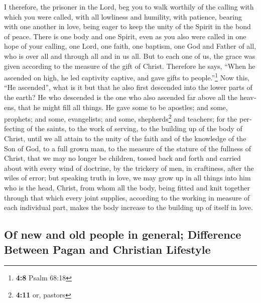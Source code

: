 \begin{paracol}{2}
\begin{otherlanguage}{english}
 I therefore, the prisoner in the Lord, beg you to walk
worthily of the calling with which you were called,  with
all lowliness and humility, with patience, bearing with one another in
love,  being eager to keep the unity of the Spirit in the
bond of peace.  There is one body and one Spirit, even as
you also were called in one hope of your calling,  one
Lord, one faith, one baptism,  one God and Father of all,
who is over all and through all and in us all.  But to
each one of us, the grace was given according to the measure of the gift
of Christ.  Therefore he says, ``When he ascended on high,
he led captivity captive, and gave gifts to people.''\footnote{\textbf{4:8}
  Psalm 68:18}  Now this, ``He ascended'', what is it but
that he also first descended into the lower parts of the earth?
 He who descended is the one who also ascended far above
all the heavens, that he might fill all things.  He gave
some to be apostles; and some, prophets; and some, evangelists; and
some, shepherds\footnote{\textbf{4:11} or, pastors} and teachers;
 for the perfecting of the saints, to the work of
serving, to the building up of the body of Christ,  until
we all attain to the unity of the faith and of the knowledge of the Son
of God, to a full grown man, to the measure of the stature of the
fullness of Christ,  that we may no longer be children,
tossed back and forth and carried about with every wind of doctrine, by
the trickery of men, in craftiness, after the wiles of error;
 but speaking truth in love, we may grow up in all things
into him who is the head, Christ,  from whom all the
body, being fitted and knit together through that which every joint
supplies, according to the working in measure of each individual part,
makes the body increase to the building up of itself in love.

\hypertarget{of-new-and-old-people-in-general-difference-between-pagan-and-christian-lifestyle}{%
\subsection{Of new and old people in general; Difference Between Pagan
and Christian
Lifestyle}\label{of-new-and-old-people-in-general-difference-between-pagan-and-christian-lifestyle}}


\end{otherlanguage}
\end{paracol}
